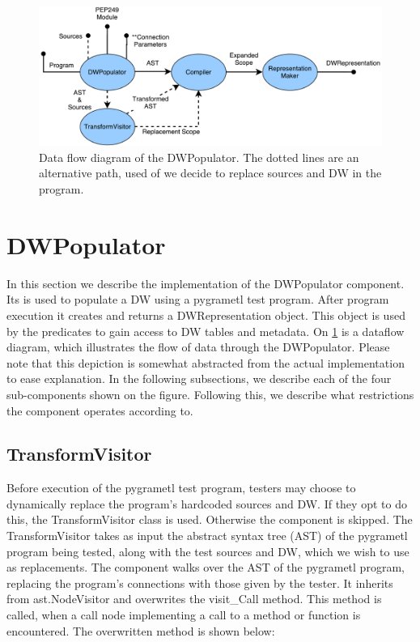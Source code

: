 \begin{figure}
\centering
\includegraphics[width=\textwidth]{figures/reinterpreter.pdf}
\caption{Data flow diagram of the DWPopulator. The dotted lines are an alternative path, used of we decide to replace sources and DW in the program.}
\label{fig:reinterpreter}
\end{figure}
\section{DWPopulator}\label{sec:dwpopulator}

In this section we describe the implementation of the DWPopulator component. Its is used to populate a DW using a pygrametl test program. After program execution it creates and returns a DWRepresentation object. This object is used by the predicates to gain access to DW tables and metadata. On \cref{fig:reinterpreter} is a dataflow diagram, which illustrates the flow of data through the DWPopulator. Please note that this depiction is somewhat abstracted from the actual implementation to ease explanation. In the following subsections, we describe each of the four sub-components shown on the figure. Following this, we describe what restrictions the component operates according to.

\subsection{TransformVisitor}
Before execution of the pygrametl test program, testers may choose to dynamically replace the program's hardcoded sources and DW. If they opt to do this, the TransformVisitor class is used. Otherwise the component is skipped.
The TransformVisitor takes as input the abstract syntax tree (AST) of the pygrametl program being tested, along with the test sources and DW, which we wish to use as replacements. The component walks over the AST of the pygrametl program, replacing the program's connections with those given by the tester. It inherits from ast.NodeVisitor and overwrites the visit\_Call method. This method is called, when a call node implementing a call to a method or function is encountered. The overwritten method is shown below:

